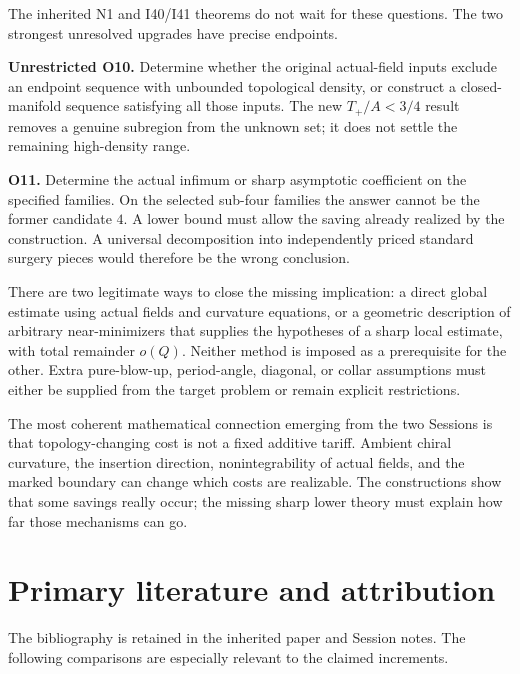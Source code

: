 \documentclass[
]{article}
\begin{document}
The inherited N1 and I40/I41 theorems do not wait for these questions.
The two strongest unresolved upgrades have precise endpoints.

\textbf{Unrestricted O10.} Determine whether the original actual-field
inputs exclude an endpoint sequence with unbounded topological density,
or construct a closed-manifold sequence satisfying all those inputs. The
new \(T_+/A<3/4\) result removes a genuine subregion from the unknown
set; it does not settle the remaining high-density range.

\textbf{O11.} Determine the actual infimum or sharp asymptotic
coefficient on the specified families. On the selected sub-four families
the answer cannot be the former candidate \(4\). A lower bound must
allow the saving already realized by the construction. A universal
decomposition into independently priced standard surgery pieces would
therefore be the wrong conclusion.

There are two legitimate ways to close the missing implication: a direct
global estimate using actual fields and curvature equations, or a
geometric description of arbitrary near-minimizers that supplies the
hypotheses of a sharp local estimate, with total remainder \(o(Q)\).
Neither method is imposed as a prerequisite for the other. Extra
pure-blow-up, period-angle, diagonal, or collar assumptions must either
be supplied from the target problem or remain explicit restrictions.

The most coherent mathematical connection emerging from the two Sessions
is that topology-changing cost is not a fixed additive tariff. Ambient
chiral curvature, the insertion direction, nonintegrability of actual
fields, and the marked boundary can change which costs are realizable.
The constructions show that some savings really occur; the missing sharp
lower theory must explain how far those mechanisms can go.

\hypertarget{primary-literature-and-attribution}{%
\section{Primary literature and
attribution}\label{primary-literature-and-attribution}}

The bibliography is retained in the inherited paper and Session notes.
The following comparisons are especially relevant to the claimed
increments.
\end{document}

